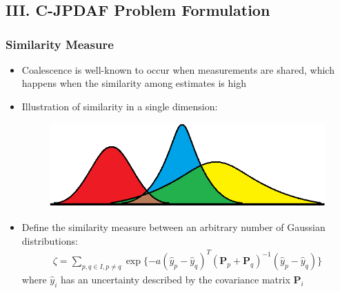 \documentclass[hyperref={pdftex,pdfpagemode=none,pdfstartview=FitH},10pt]{beamer}
\begin{document}
\section*{}
\subsection*{III. C-JPDAF Problem Formulation}


\begin{frame}
\frametitle{Similarity Measure}

\begin{itemize}
\item Coalescence is well-known to occur when measurements are shared, which happens when the similarity among estimates is high
\item Illustration of similarity in a single dimension:
\begin{figure}
\centerline{
		{\includegraphics[width=.7\columnwidth]{GaussianDistOverlap1D.png}}
	}
\end{figure}
\item Define the similarity measure between an arbitrary number of Gaussian distributions:
\begin{align}
\zeta=\sum\limits_{p,q\in I,p\neq q}\exp \{-a(\hat y_{p}- \hat y_{q})^T({\mathbf P}_{p}
+{\mathbf P}_{q})^{-1}(\hat y_{p}-\hat y_{q})\}
\end{align}
where $\hat y_i$ has an uncertainty described by the covariance matrix ${\mathbf P}_{i}$
\end{itemize}

\end{frame}
\end{document}
